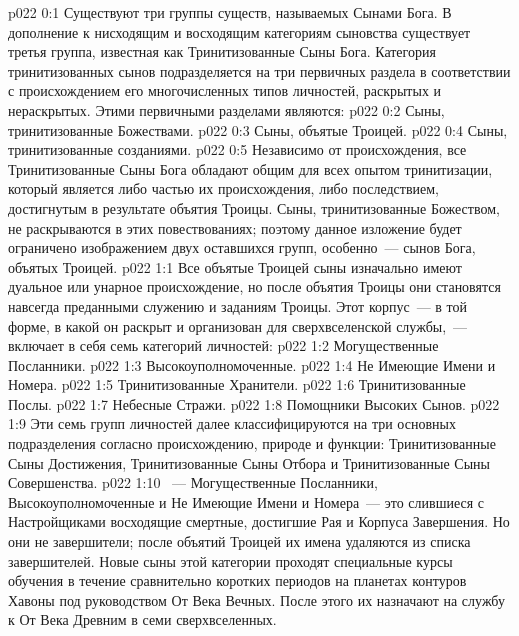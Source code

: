 \author{Могущественный Посланник}
\vs p022 0:1 Существуют три группы существ, называемых Сынами Бога. В дополнение к нисходящим и восходящим категориям сыновства существует третья группа, известная как Тринитизованные Сыны Бога. Категория тринитизованных сынов подразделяется на три первичных раздела в соответствии с происхождением его многочисленных типов личностей, раскрытых и нераскрытых. Этими первичными разделами являются:
\vs p022 0:2 Сыны, тринитизованные Божествами.
\vs p022 0:3 Сыны, объятые Троицей.
\vs p022 0:4 Сыны, тринитизованные созданиями.
\vs p022 0:5 Независимо от происхождения, все Тринитизованные Сыны Бога обладают общим для всех опытом тринитизации, который является либо частью их происхождения, либо последствием, достигнутым в результате объятия Троицы. Сыны, тринитизованные Божеством, не раскрываются в этих повествованиях; поэтому данное изложение будет ограничено изображением двух оставшихся групп, особенно~--- сынов Бога, объятых Троицей.
\vs p022 1:1 Все объятые Троицей сыны изначально имеют дуальное или унарное происхождение, но после объятия Троицы они становятся навсегда преданными служению и заданиям Троицы. Этот корпус~--- в той форме, в какой он раскрыт и организован для сверхвселенской службы,~--- включает в себя семь категорий личностей:
\vs p022 1:2 Могущественные Посланники.
\vs p022 1:3 Высокоуполномоченные.
\vs p022 1:4 Не Имеющие Имени и Номера.
\vs p022 1:5 Тринитизованные Хранители.
\vs p022 1:6 Тринитизованные Послы.
\vs p022 1:7 Небесные Стражи.
\vs p022 1:8 Помощники Высоких Сынов.
\vs p022 1:9 \pc Эти семь групп личностей далее классифицируются на три основных подразделения согласно происхождению, природе и функции: Тринитизованные Сыны Достижения, Тринитизованные Сыны Отбора и Тринитизованные Сыны Совершенства.
\vs p022 1:10 \pc {}~--- Могущественные Посланники, Высокоуполномоченные и Не Имеющие Имени и Номера~--- это слившиеся с Настройщиками восходящие смертные, достигшие Рая и Корпуса Завершения. Но они не завершители; после объятий Троицей их имена удаляются из списка завершителей. Новые сыны этой категории проходят специальные курсы обучения в течение сравнительно коротких периодов на планетах контуров Хавоны под руководством От Века Вечных. После этого их назначают на службу к От Века Древним в семи сверхвселенных.
